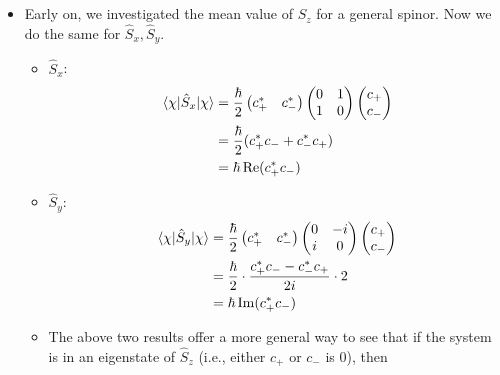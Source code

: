 \documentclass[../notes.tex]{subfiles}
\begin{document}
\begin{itemize}
\begin{itemize}
    \end{itemize}
    \item Early on, we investigated the mean value of $\hat{S}_z$ for a general spinor. Now we do the same for $\hat{S}_x,\hat{S}_y$.
    \begin{itemize}
        \item $\hat{S}_x$:
        \begin{align*}
            \ev{\hat{S}_x}{\chi} &= \frac{\hbar}{2}
            \begin{pmatrix}
                c_+^* & c_-^*\\
            \end{pmatrix}
            \begin{pmatrix}
                0 & 1\\
                1 & 0\\
            \end{pmatrix}
            \begin{pmatrix}
                c_+\\
                c_-\\
            \end{pmatrix}\\
            &= \frac{\hbar}{2}(c_+^*c_-+c_-^*c_+)\\
            &= \hbar\re(c_+^*c_-)
        \end{align*}
        \item $\hat{S}_y$:
        \begin{align*}
            \ev{\hat{S}_y}{\chi} &= \frac{\hbar}{2}
            \begin{pmatrix}
                c_+^* & c_-^*\\
            \end{pmatrix}
            \begin{pmatrix}
                0 & -i\\
                i & 0\\
            \end{pmatrix}
            \begin{pmatrix}
                c_+\\
                c_-\\
            \end{pmatrix}\\
            &= \frac{\hbar}{2}\cdot\frac{c_+^*c_--c_-^*c_+}{2i}\cdot 2\\
            &= \hbar\im(c_+^*c_-)
        \end{align*}
        \item The above two results offer a more general way to see that if the system is in an eigenstate of $\hat{S}_z$ (i.e., either $c_+$ or $c_-$ is 0), then

\end{itemize}
\end{itemize}
\end{document}
